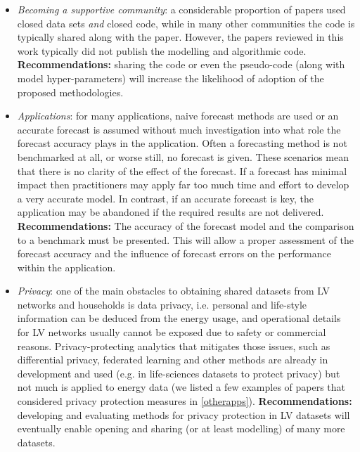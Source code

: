 \begin{itemize}
	\item \textit{Becoming a supportive community}: a considerable proportion of papers used closed data sets \emph{and} closed code, while in many other communities the code is typically shared along with the paper. However, the papers reviewed in this work typically did not publish the modelling and algorithmic code. \textbf{Recommendations:} sharing the code or even the pseudo-code (along with model hyper-parameters) will increase the likelihood of adoption of the proposed methodologies. 
	
	\item \textit{Applications}: for many applications, naive forecast methods are used or an accurate forecast is assumed without much investigation into what role the forecast accuracy plays in the application. Often a forecasting method is not benchmarked at all, or worse still, no forecast is given. These scenarios mean that there is no clarity of the effect of the forecast. If a forecast has minimal impact then practitioners may apply far too much time and effort to develop a very accurate model. In contrast, if an accurate forecast is key, the application may be abandoned if the required results are not delivered. \textbf{Recommendations:} The accuracy of the forecast model and the comparison to a benchmark must be presented. This will allow a proper assessment of the forecast accuracy and the influence of forecast errors on the performance within the application. 
	
	\item \textit{Privacy}: one of the main obstacles to obtaining shared datasets from LV networks and households is data privacy, i.e. personal and life-style information can be deduced from the energy usage, and operational details for LV networks usually cannot be exposed due to safety or commercial reasons. Privacy-protecting analytics that mitigates those issues, such as differential privacy, federated learning and other methods are already in development and used (e.g. in life-sciences datasets to protect privacy) but not much is applied to energy data (we listed a few examples of papers that considered privacy protection measures in \ref{otherapps}). \textbf{Recommendations:} developing and evaluating methods for privacy protection in LV datasets will eventually enable opening and sharing (or at least modelling) of many more datasets. 
	

\end{itemize}
